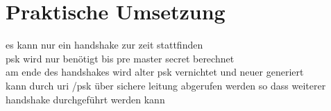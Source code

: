 \chapter{Praktische Umsetzung}

es kann nur ein handshake zur zeit stattfinden\\
psk wird nur benötigt bis pre master secret berechnet\\
am ende des handshakes wird alter psk vernichtet und neuer generiert\\
kann durch uri /psk über sichere leitung abgerufen werden so dass weiterer handshake durchgeführt werden kann


